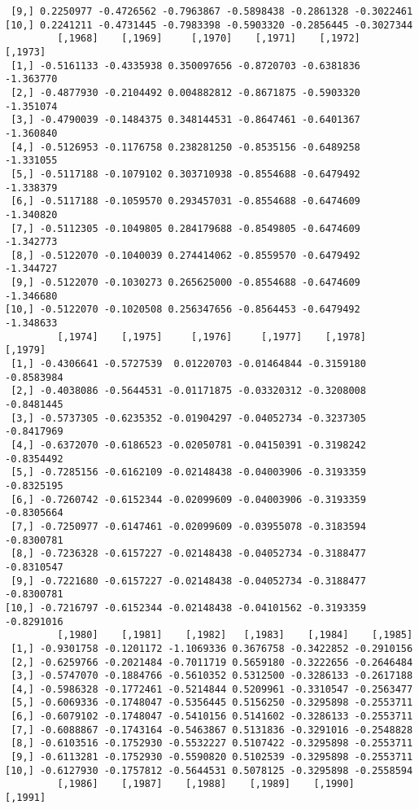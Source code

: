 \documentclass[
  letterpaper,
  DIV=11,
  numbers=noendperiod]{scrreprt}
\begin{document}
\begin{verbatim}
 [9,] 0.2250977 -0.4726562 -0.7963867 -0.5898438 -0.2861328 -0.3022461
[10,] 0.2241211 -0.4731445 -0.7983398 -0.5903320 -0.2856445 -0.3027344
         [,1968]    [,1969]     [,1970]    [,1971]    [,1972]   [,1973]
 [1,] -0.5161133 -0.4335938 0.350097656 -0.8720703 -0.6381836 -1.363770
 [2,] -0.4877930 -0.2104492 0.004882812 -0.8671875 -0.5903320 -1.351074
 [3,] -0.4790039 -0.1484375 0.348144531 -0.8647461 -0.6401367 -1.360840
 [4,] -0.5126953 -0.1176758 0.238281250 -0.8535156 -0.6489258 -1.331055
 [5,] -0.5117188 -0.1079102 0.303710938 -0.8554688 -0.6479492 -1.338379
 [6,] -0.5117188 -0.1059570 0.293457031 -0.8554688 -0.6474609 -1.340820
 [7,] -0.5112305 -0.1049805 0.284179688 -0.8549805 -0.6474609 -1.342773
 [8,] -0.5122070 -0.1040039 0.274414062 -0.8559570 -0.6479492 -1.344727
 [9,] -0.5122070 -0.1030273 0.265625000 -0.8554688 -0.6474609 -1.346680
[10,] -0.5122070 -0.1020508 0.256347656 -0.8564453 -0.6479492 -1.348633
         [,1974]    [,1975]     [,1976]     [,1977]    [,1978]    [,1979]
 [1,] -0.4306641 -0.5727539  0.01220703 -0.01464844 -0.3159180 -0.8583984
 [2,] -0.4038086 -0.5644531 -0.01171875 -0.03320312 -0.3208008 -0.8481445
 [3,] -0.5737305 -0.6235352 -0.01904297 -0.04052734 -0.3237305 -0.8417969
 [4,] -0.6372070 -0.6186523 -0.02050781 -0.04150391 -0.3198242 -0.8354492
 [5,] -0.7285156 -0.6162109 -0.02148438 -0.04003906 -0.3193359 -0.8325195
 [6,] -0.7260742 -0.6152344 -0.02099609 -0.04003906 -0.3193359 -0.8305664
 [7,] -0.7250977 -0.6147461 -0.02099609 -0.03955078 -0.3183594 -0.8300781
 [8,] -0.7236328 -0.6157227 -0.02148438 -0.04052734 -0.3188477 -0.8310547
 [9,] -0.7221680 -0.6157227 -0.02148438 -0.04052734 -0.3188477 -0.8300781
[10,] -0.7216797 -0.6152344 -0.02148438 -0.04101562 -0.3193359 -0.8291016
         [,1980]    [,1981]    [,1982]   [,1983]    [,1984]    [,1985]
 [1,] -0.9301758 -0.1201172 -1.1069336 0.3676758 -0.3422852 -0.2910156
 [2,] -0.6259766 -0.2021484 -0.7011719 0.5659180 -0.3222656 -0.2646484
 [3,] -0.5747070 -0.1884766 -0.5610352 0.5312500 -0.3286133 -0.2617188
 [4,] -0.5986328 -0.1772461 -0.5214844 0.5209961 -0.3310547 -0.2563477
 [5,] -0.6069336 -0.1748047 -0.5356445 0.5156250 -0.3295898 -0.2553711
 [6,] -0.6079102 -0.1748047 -0.5410156 0.5141602 -0.3286133 -0.2553711
 [7,] -0.6088867 -0.1743164 -0.5463867 0.5131836 -0.3291016 -0.2548828
 [8,] -0.6103516 -0.1752930 -0.5532227 0.5107422 -0.3295898 -0.2553711
 [9,] -0.6113281 -0.1752930 -0.5590820 0.5102539 -0.3295898 -0.2553711
[10,] -0.6127930 -0.1757812 -0.5644531 0.5078125 -0.3295898 -0.2558594
         [,1986]    [,1987]    [,1988]    [,1989]    [,1990]    [,1991]

\end{verbatim}
\end{document}
